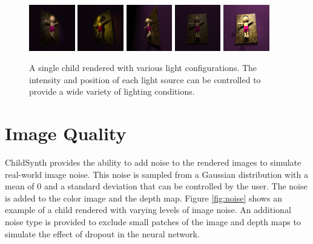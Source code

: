 \documentclass{article}
\begin{document}
\begin{figure}[htbp]
    \centering
    \includegraphics[height=2.0cm]{plots/light0.png}
    \includegraphics[height=2.0cm]{plots/light2.png}
    \includegraphics[height=2.0cm]{plots/light3.png}
    \includegraphics[height=2.0cm]{plots/light4.png}
    \includegraphics[height=2.0cm]{plots/light5.png}
    \caption{A single child rendered with various light configurations. The intensity and position of each light source can be controlled to provide a wide variety of lighting conditions.}
    \label{fig:lighting}
\end{figure}

\section{Image Quality}

ChildSynth provides the ability to add noise to the rendered images to simulate real-world image noise. This noise is sampled from a Gaussian distribution with a mean of $0$ and a standard deviation that can be controlled by the user. The noise is added to the color image and the depth map. Figure \ref{fig:noise} shows an example of a child rendered with varying levels of image noise. An additional noise type is provided to exclude small patches of the image and depth maps to simulate the effect of dropout in the neural network.
\end{document}
